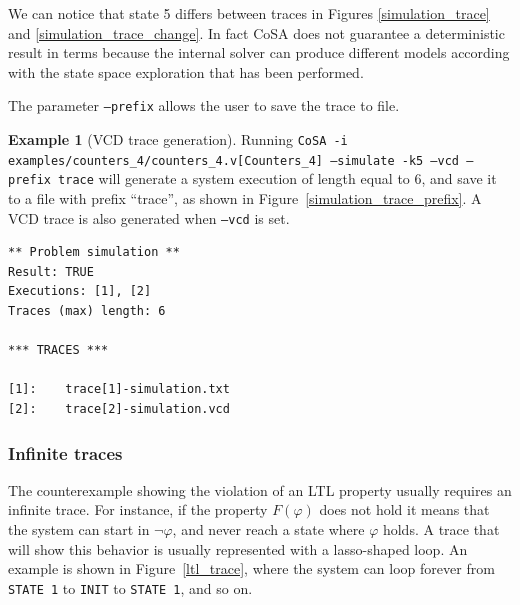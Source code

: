 \documentclass{article}
\theoremstyle{definition}
\newtheorem{example}{Example}[section]
\begin{document}
We can notice that state 5 differs between traces in Figures
\ref{simulation_trace} and \ref{simulation_trace_change}. In fact CoSA
does not guarantee a deterministic result in terms because the
internal solver can produce different models according with the state
space exploration that has been performed.

The parameter \texttt{--prefix} allows the user to save the trace to
file.

\begin{example}[VCD trace generation]
  Running \texttt{CoSA -i
    examples/counters\_4/counters\_4.v[Counters\_4] --simulate -k5
    --vcd --prefix trace} will generate a system execution of length
  equal to 6, and save it to a file with prefix ``trace'', as shown in
  Figure~\ref{simulation_trace_prefix}. A VCD trace is also generated
  when \texttt{--vcd} is set.

\begin{lstlisting}[frame=single,language=ets,caption=Simulation Counter\_4 (with prefix),label=simulation_trace_prefix]
** Problem simulation **
Result: TRUE
Executions: [1], [2]
Traces (max) length: 6

*** TRACES ***

[1]:	trace[1]-simulation.txt
[2]:	trace[2]-simulation.vcd
\end{lstlisting}

\end{example}



\subsubsection{Infinite traces}

The counterexample showing the violation of an LTL property usually
requires an infinite trace. For instance, if the property $F(\varphi)$
does not hold it means that the system can start in $\neg \varphi$,
and never reach a state where $\varphi$ holds. A trace that will show
this behavior is usually represented with a lasso-shaped loop. An
example is shown in Figure~\ref{ltl_trace}, where the system can loop
forever from \texttt{STATE 1} to \texttt{INIT} to \texttt{STATE 1},
and so on.
\end{document}
